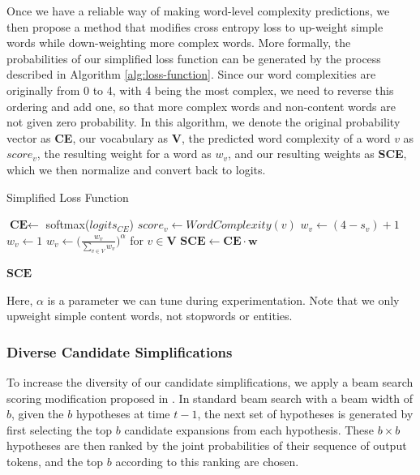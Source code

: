 \documentclass[thesis.tex]{subfiles}
\begin{document}
Once we have a reliable way of making word-level complexity predictions, we then propose a method that modifies cross entropy loss to up-weight simple words while down-weighting more complex words. More formally, the probabilities of our simplified loss function can be generated by the process described in Algorithm \ref{alg:loss-function}. Since our word complexities are originally from 0 to 4, with 4 being the most complex, we need to reverse this ordering and add one, so that more complex words and non-content words are not given zero probability. In this algorithm, we denote the original probability vector as \textbf{CE}, our vocabulary as $\textbf{V}$, the predicted word complexity of a word $v$ as $score_v$, the resulting weight for a word as $w_v$, and our resulting weights as \textbf{SCE}, which we then normalize and convert back to logits.

\begin{algorithm}
\caption{Simplified Loss Function}
\label{alg:loss-function}

\begin{algorithmic}[1]
\State $\textbf{CE} \gets$ softmax($logits_{CE}$)
    \State $score_v \gets WordComplexity(v)$
        \State $w_v \gets (4 - s_v) + 1$
    \Else
        \State $w_v \gets 1$
    \EndIf
\EndFor
\State $w_v \gets \Big(\frac{w_v}{\sum_{v\in V}w_v}\Big)^{\alpha}$ for $v \in \textbf{V}$
\State $\textbf{SCE} \gets \textbf{CE} \cdot \textbf{w}$

\Return $\textbf{SCE}$
\EndProcedure
\end{algorithmic}
\end{algorithm}

Here, $\alpha$ is a parameter we can tune during experimentation.
Note that we only upweight simple content words, not stopwords or entities.

\subsubsection{Diverse Candidate Simplifications} \label{sec:sentence_diverse}

To increase the diversity of our candidate simplifications, we apply a beam search scoring modification proposed in \cite{li2016simple}. In standard beam search with a beam width of $b$, given the $b$ hypotheses at time $t-1$, the next set of hypotheses is generated by first selecting the top $b$ candidate expansions from each hypothesis. These $b\times b$ hypotheses are then ranked by the joint probabilities of their sequence of output tokens, and the top $b$ according to this ranking are chosen.
\end{document}
